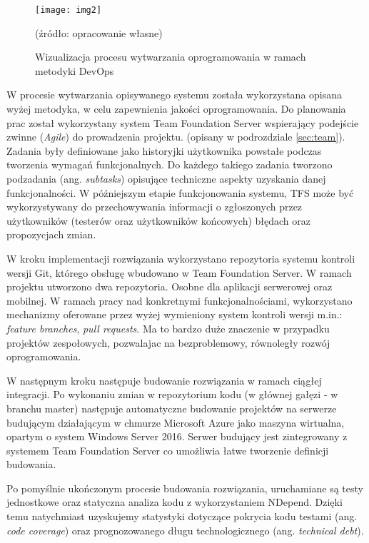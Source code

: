 \begin{figure}[h]
\centering
\texttt{[image: img2]}
\caption{Wizualizacja procesu wytwarzania oprogramowania w ramach metodyki DevOps}
(źródło: opracowanie własne)
\end{figure}

W procesie wytwarzania opisywanego systemu została wykorzystana opisana wyżej metodyka, w celu zapewnienia jakości oprogramowania. Do planowania prac został wykorzystany system Team Foundation Server wspierający podejście zwinne (\textit{Agile}) do prowadzenia projektu. (opisany w podrozdziale \ref{sec:team}). Zadania były definiowane jako historyjki użytkownika powstałe podczas tworzenia wymagań funkcjonalnych. Do każdego takiego zadania tworzono podzadania (ang. \textit{subtasks}) opisujące techniczne aspekty uzyskania danej funkcjonalności. W późniejszym etapie funkcjonowania systemu, TFS może być wykorzystywany do przechowywania informacji o zgłoszonych przez użytkowników (testerów oraz użytkowników końcowych) błędach oraz propozycjach zmian.

W kroku implementacji rozwiązania wykorzystano repozytoria systemu kontroli wersji Git, którego obsługę wbudowano w Team Foundation Server. W ramach projektu utworzono dwa repozytoria. Osobne dla aplikacji serwerowej oraz mobilnej. W ramach pracy nad konkretnymi funkcjonalnościami, wykorzystano mechanizmy oferowane przez wyżej wymieniony system kontroli wersji  m.in.: \textit{feature branches}, \textit{pull requests}. Ma to bardzo duże znaczenie w przypadku projektów zespołowych, pozwalajac na bezproblemowy, równoległy rozwój oprogramowania.

W następnym kroku następuje budowanie rozwiązania w ramach ciągłej integracji. Po wykonaniu zmian w repozytorium kodu (w głównej gałęzi - w branchu master) następuje automatyczne budowanie projektów na serwerze budującym działającym w chmurze Microsoft Azure jako maszyna wirtualna, opartym o system Windows Server 2016. Serwer budujący jest zintegrowany z systemem Team Foundation Server co umożliwia łatwe tworzenie definicji budowania. 

Po pomyślnie ukończonym procesie budowania rozwiązania, uruchamiane są testy jednostkowe oraz statyczna analiza kodu z wykorzystaniem NDepend. Dzięki temu natychmiast uzyskujemy statystyki dotyczące pokrycia kodu testami (ang. \textit{code coverage}) oraz prognozowanego długu technologicznego (ang. \textit{technical debt}).

